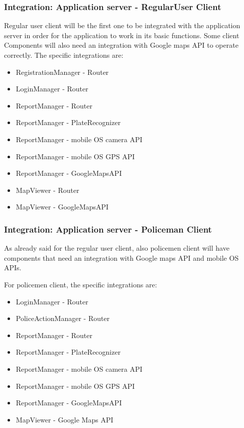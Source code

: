 \subsubsection{Integration: Application server - RegularUser Client}
Regular user client will be the first one to be integrated with the application server in order for the application to work in its basic functions.
Some client Components will also need an integration with Google maps API to operate correctly.
The specific integrations are:
\begin{itemize}
	\item RegistrationManager - Router
	\item LoginManager - Router
	\item ReportManager - Router
	\item ReportManager - PlateRecognizer
	\item ReportManager - mobile OS camera API
	\item ReportManager - mobile OS GPS API
	\item ReportManager - GoogleMapsAPI
	\item MapViewer - Router
	\item MapViewer - GoogleMapsAPI
\end{itemize}

\subsubsection{Integration: Application server - Policeman Client}
As already said for the regular user client, also policemen client will have components that need an integration with Google maps API and mobile OS APIs. \\ \par
For policemen client, the specific integrations are:
\begin{itemize}
	\item LoginManager - Router	
	\item PoliceActionManager - Router
	\item ReportManager - Router
	\item ReportManager - PlateRecognizer
	\item ReportManager - mobile OS camera API
	\item ReportManager - mobile OS GPS API
	\item ReportManager - GoogleMapsAPI
	\item MapViewer - Google Maps API
\end{itemize}

